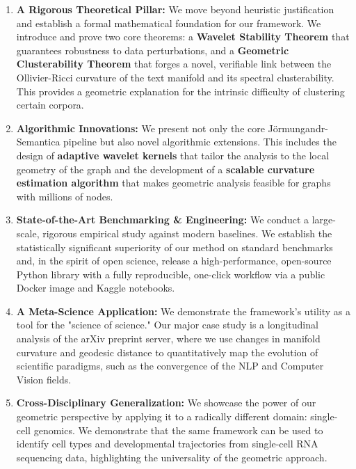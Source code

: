 \begin{enumerate}
    \item \textbf{A Rigorous Theoretical Pillar:} We move beyond heuristic justification and establish a formal mathematical foundation for our framework. We introduce and prove two core theorems: a \textbf{Wavelet Stability Theorem} that guarantees robustness to data perturbations, and a \textbf{Geometric Clusterability Theorem} that forges a novel, verifiable link between the Ollivier-Ricci curvature of the text manifold and its spectral clusterability. This provides a geometric explanation for the intrinsic difficulty of clustering certain corpora.

    \item \textbf{Algorithmic Innovations:} We present not only the core Jörmungandr-Semantica pipeline but also novel algorithmic extensions. This includes the design of \textbf{adaptive wavelet kernels} that tailor the analysis to the local geometry of the graph and the development of a \textbf{scalable curvature estimation algorithm} that makes geometric analysis feasible for graphs with millions of nodes.

    \item \textbf{State-of-the-Art Benchmarking \& Engineering:} We conduct a large-scale, rigorous empirical study against modern baselines. We establish the statistically significant superiority of our method on standard benchmarks and, in the spirit of open science, release a high-performance, open-source Python library with a fully reproducible, one-click workflow via a public Docker image and Kaggle notebooks.

    \item \textbf{A Meta-Science Application:} We demonstrate the framework's utility as a tool for the "science of science." Our major case study is a longitudinal analysis of the arXiv preprint server, where we use changes in manifold curvature and geodesic distance to quantitatively map the evolution of scientific paradigms, such as the convergence of the NLP and Computer Vision fields.

    \item \textbf{Cross-Disciplinary Generalization:} We showcase the power of our geometric perspective by applying it to a radically different domain: single-cell genomics. We demonstrate that the same framework can be used to identify cell types and developmental trajectories from single-cell RNA sequencing data, highlighting the universality of the geometric approach.
\end{enumerate}

